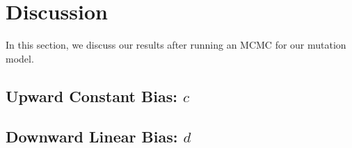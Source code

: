 \section{Discussion}\label{sec:di}
In this section, we discuss our results after running an MCMC for our mutation model.

\subsection{Upward Constant Bias: $c$}\label{subsec:ucb}
\subsection{Downward Linear Bias: $d$}\label{subsec:dlb}